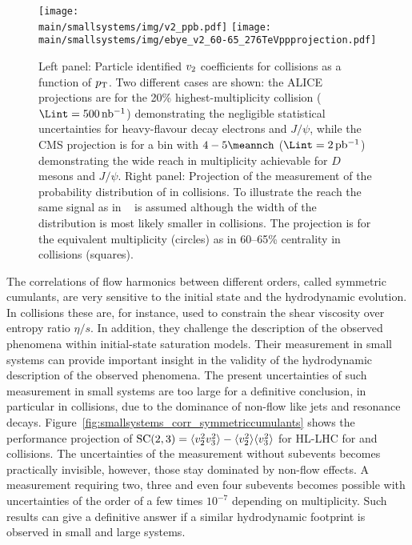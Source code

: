 \documentclass[../report.tex]{subfiles}
\providecommand{\main}{..}
\begin{document}
\begin{figure}[t!]
\centering
\texttt{[image: \\main/smallsystems/img/v2\_ppb.pdf]}
\hfill
\texttt{[image: \\main/smallsystems/img/ebye\_v2\_60-65\_276TeVppprojection.pdf]}
\caption{Left panel: Particle identified $v_{\rm{2}}$ coefficients for \pPb collisions as a function of $p\sb{\scriptstyle\mathrm{T}}$. Two different cases are shown: the ALICE projections are for the 20\% highest-multiplicity collision ($\Lint = \unit[500]{nb^{-1}}$) demonstrating the negligible statistical uncertainties for heavy-flavour decay electrons and $J/\psi$, while the CMS projection is for a bin with $4-5 \meannch$ ($\Lint = \unit[2]{pb^{-1}}$) demonstrating the wide reach in multiplicity achievable for $D$ mesons and $J/\psi$. 
Right panel: Projection of the measurement of the probability distribution of \vtwo in \pp collisions. To illustrate the reach the same signal as in \PbPb~\cite{Aad:2013xma} is assumed although the width of the distribution is most likely smaller in \pp collisions. The projection is for the equivalent \pp multiplicity (circles) as in 60--65\% centrality in \PbPb collisions (squares).}
\label{fig:smallsystems_corr_pid_pvn}
\end{figure}

The correlations of flow harmonics between different orders, called symmetric cumulants, are very sensitive to the initial state and the hydrodynamic evolution. In \PbPb collisions these are, for instance, used to constrain the shear viscosity over entropy ratio $\eta/s$. In addition, they challenge the description of the observed phenomena within initial-state saturation models.
Their measurement in small systems can provide important insight in the validity of the hydrodynamic description of the observed phenomena. The present uncertainties of such measurement in small systems are too large for a definitive conclusion, in particular in \pp collisions, due to the dominance of non-flow like jets and resonance decays. Figure~\ref{fig:smallsystems_corr_symmetriccumulants} shows the performance projection of ${\rm SC}(2,3) = \langle v_2^2 v_3^2 \rangle - \langle v_2^2 \rangle \langle v_3^2 \rangle$ for HL-LHC for \pp and \pPb collisions. The uncertainties of the measurement without subevents becomes practically invisible, however, those stay dominated by non-flow effects. A measurement requiring two, three and even four subevents becomes possible with uncertainties of the order of a few times $10^{-7}$ depending on multiplicity. Such results can give a definitive answer if a similar hydrodynamic footprint is observed in small and large systems.
\end{document}
